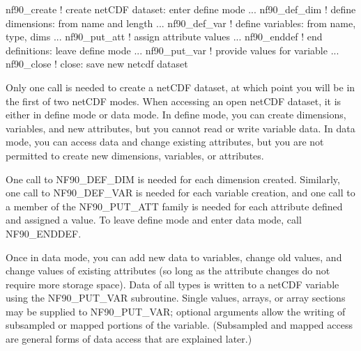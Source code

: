 \begin{DoxyCode}
nf90\_create           \textcolor{comment}{! create netCDF dataset: enter define mode}
     ...
   nf90\_def\_dim       \textcolor{comment}{! define dimensions: from name and length}
     ...
   nf90\_def\_var       \textcolor{comment}{! define variables: from name, type, dims}
     ...
   nf90\_put\_att       \textcolor{comment}{! assign attribute values}
     ...
nf90\_enddef           \textcolor{comment}{! end definitions: leave define mode}
     ...
   nf90\_put\_var       \textcolor{comment}{! provide values for variable}
     ...
nf90\_close            ! close: \textcolor{keywordtype}{save} new netcdf dataset
\end{DoxyCode}


Only one call is needed to create a net\+C\+DF dataset, at which point you will be in the first of two net\+C\+DF modes. When accessing an open net\+C\+DF dataset, it is either in define mode or data mode. In define mode, you can create dimensions, variables, and new attributes, but you cannot read or write variable data. In data mode, you can access data and change existing attributes, but you are not permitted to create new dimensions, variables, or attributes.

One call to N\+F90\+\_\+\+D\+E\+F\+\_\+\+D\+IM is needed for each dimension created. Similarly, one call to N\+F90\+\_\+\+D\+E\+F\+\_\+\+V\+AR is needed for each variable creation, and one call to a member of the N\+F90\+\_\+\+P\+U\+T\+\_\+\+A\+TT family is needed for each attribute defined and assigned a value. To leave define mode and enter data mode, call N\+F90\+\_\+\+E\+N\+D\+D\+EF.

Once in data mode, you can add new data to variables, change old values, and change values of existing attributes (so long as the attribute changes do not require more storage space). Data of all types is written to a net\+C\+DF variable using the N\+F90\+\_\+\+P\+U\+T\+\_\+\+V\+AR subroutine. Single values, arrays, or array sections may be supplied to N\+F90\+\_\+\+P\+U\+T\+\_\+\+V\+AR; optional arguments allow the writing of subsampled or mapped portions of the variable. (Subsampled and mapped access are general forms of data access that are explained later.)

